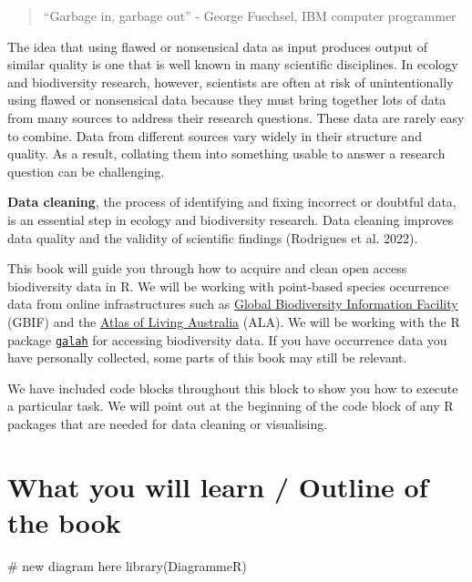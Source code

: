 \documentclass[
  letterpaper,
  DIV=11,
  numbers=noendperiod,
  oneside]{scrreprt}
\newenvironment{Shaded}{\begin{snugshade}}{\end{snugshade}}
\newcommand{\CommentTok}[1]{\textcolor[rgb]{0.37,0.37,0.37}{#1}}
\newcommand{\FunctionTok}[1]{\textcolor[rgb]{0.28,0.35,0.67}{#1}}
\newcommand{\NormalTok}[1]{\textcolor[rgb]{0.00,0.23,0.31}{#1}}
\begin{document}
\begin{quote}
``Garbage in, garbage out'' - George Fuechsel, IBM computer programmer
\end{quote}

The idea that using flawed or nonsensical data as input produces output
of similar quality is one that is well known in many scientific
disciplines. In ecology and biodiversity research, however, scientists
are often at risk of unintentionally using flawed or nonsensical data
because they must bring together lots of data from many sources to
address their research questions. These data are rarely easy to combine.
Data from different sources vary widely in their structure and quality.
As a result, collating them into something usable to answer a research
question can be challenging.

\textbf{Data cleaning}, the process of identifying and fixing incorrect
or doubtful data, is an essential step in ecology and biodiversity
research. Data cleaning improves data quality and the validity of
scientific findings (Rodrigues et al. 2022).

This book will guide you through how to acquire and clean open access
biodiversity data in R. We will be working with point-based species
occurrence data from online infrastructures such as
\href{https://www.gbif.org/}{Global Biodiversity Information Facility}
(GBIF) and the \href{https://www.ala.org.au/}{Atlas of Living Australia}
(ALA). We will be working with the R package
\href{https://galah.ala.org.au/}{\texttt{galah}} for accessing
biodiversity data. If you have occurrence data you have personally
collected, some parts of this book may still be relevant.

We have included code blocks throughout this block to show you how to
execute a particular task. We will point out at the beginning of the
code block of any R packages that are needed for data cleaning or
visualising.

\hypertarget{what-you-will-learn-outline-of-the-book}{%
\section{What you will learn / Outline of the
book}\label{what-you-will-learn-outline-of-the-book}}

\begin{Shaded}
\begin{Highlighting}[]
\CommentTok{\# new diagram here}
\FunctionTok{library}\NormalTok{(DiagrammeR)}
\end{Highlighting}
\end{Shaded}
\end{document}
